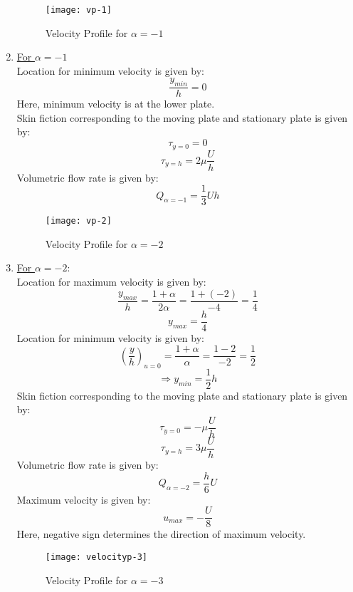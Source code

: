 \documentclass[14pt,one side, a4paper]{extbook}
\begin{document}
	 	\begin{enumerate}
	 		\begin{figure}[ht]
	 			\centering
	 			\texttt{[image: vp-1]}
	 			\caption{Velocity Profile for $\alpha=-1$}
	 			\label{fig:vp-1}
	 		\end{figure}
	 		
	 		\item {\underline{For $\alpha=-1$}}
	 		\\Location for minimum velocity is given by:
	 		$$\frac{y_{min}}{h}=0$$
	 		Here, minimum velocity is at the lower plate.
	 		\\Skin fiction corresponding to the moving plate and stationary plate is given by:
	 		$$\tau_{y=0}=0$$
	 		$$\tau_{y=h}=2\mu\frac{U}{h}$$
	 		Volumetric flow rate is given by:
	 		$$Q_{\alpha=-1}=\frac{1}{3}Uh$$
	 		\begin{figure}[ht]
	 			\centering
	 			\texttt{[image: vp-2]}
	 			\caption{Velocity Profile for $\alpha=-2$}
	 			\label{fig:vp-2}
	 		\end{figure}
	 		
	 		\item {\underline{For $\alpha=-2$}:}
	 		\\Location for maximum velocity is given by:
	 		$$\frac{y_{max}}{h}=\frac{1+\alpha}{2\alpha}=\frac{1+(-2)}{-4}=\frac{1}{4}$$
	 		$$y_{max}=\frac{h}{4}$$
	 		Location for minimum velocity is given by:
	 		$$\left(\frac{y}{h}\right)_{u=0}=\frac{1+\alpha}{\alpha}=\frac{1-2}{-2}=\frac{1}{2}$$
	 		$$\Longrightarrow y_{min}=\frac{1}{2}h$$
	 		Skin fiction corresponding to the moving plate and stationary plate is given by:
	 		$$\tau_{y=0}=-\mu\frac{U}{h}$$
	 		$$\tau_{y=h}=3\mu\frac{U}{h}$$
	 		Volumetric flow rate is given by:
	 		$$Q_{\alpha=-2}=\frac{h}{6}U$$
	 		Maximum velocity is given by:
	 		$$u_{max}=-\frac{U}{8}$$
	 		Here, negative sign determines the direction of maximum velocity.
	 		\begin{figure}[ht]
	 			\centering
	 			\texttt{[image: velocityp-3]}
	 			\caption{Velocity Profile for $\alpha=-3$}
	 			\label{fig:velocityp-3}
	 		\end{figure}
	 		

\end{enumerate}
\end{document}
